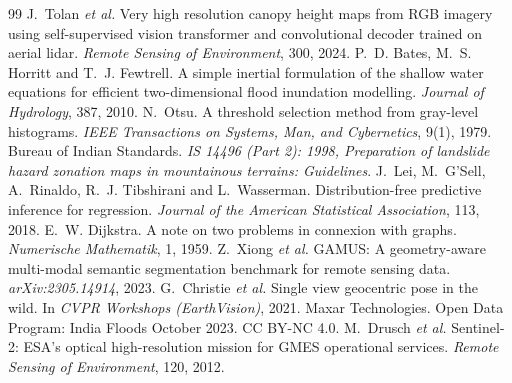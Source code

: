 \documentclass[11pt,a4paper]{article}
\begin{document}
\begin{thebibliography}{99}
 J.~Tolan \emph{et al.} Very high resolution canopy height maps from RGB imagery using self-supervised vision transformer and convolutional decoder trained on aerial lidar. \emph{Remote Sensing of Environment}, 300, 2024.
 P.~D. Bates, M.~S. Horritt and T.~J. Fewtrell. A simple inertial formulation of the shallow water equations for efficient two-dimensional flood inundation modelling. \emph{Journal of Hydrology}, 387, 2010.
 N.~Otsu. A threshold selection method from gray-level histograms. \emph{IEEE Transactions on Systems, Man, and Cybernetics}, 9(1), 1979.
 Bureau of Indian Standards. \emph{IS 14496 (Part 2): 1998, Preparation of landslide hazard zonation maps in mountainous terrains: Guidelines}.
 J.~Lei, M.~G'Sell, A.~Rinaldo, R.~J. Tibshirani and L.~Wasserman. Distribution-free predictive inference for regression. \emph{Journal of the American Statistical Association}, 113, 2018.
 E.~W. Dijkstra. A note on two problems in connexion with graphs. \emph{Numerische Mathematik}, 1, 1959.
 Z.~Xiong \emph{et al.} GAMUS: A geometry-aware multi-modal semantic segmentation benchmark for remote sensing data. \emph{arXiv:2305.14914}, 2023.
 G.~Christie \emph{et al.} Single view geocentric pose in the wild. In \emph{CVPR Workshops (EarthVision)}, 2021.
 Maxar Technologies. Open Data Program: India Floods October 2023. CC BY-NC 4.0.
 M.~Drusch \emph{et al.} Sentinel-2: ESA's optical high-resolution mission for GMES operational services. \emph{Remote Sensing of Environment}, 120, 2012.
\end{thebibliography}
\endgroup
\end{document}
